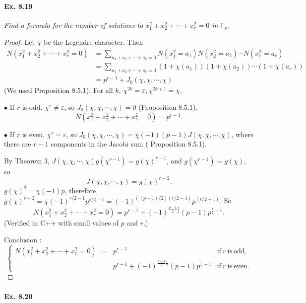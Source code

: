 \documentclass[11pt,a4paper]{article}
\newcommand{\F}{\mathbb{F}}
\begin{document}
{\paragraph{Ex. 8.19}

{\it Find a formula for the number of solutions to $x_1^2+x_2^2+\cdots+x_r^2 = 0$ in $\F_p$.
}

\begin{proof}
Let $\chi$ be the Legendre character. Then
\begin{align*}
N(x_1^2+x_2^2+\cdots+x_r^2=0) &= \sum\limits_{a_1+a_2+\cdots+a_r=0} N(x_1^2=a_1)N(x_2^2=a_2)\cdots N(x_r^2 = a_r)\\
&=\sum\limits_{a_1+a_2+\cdots+a_r=0} (1+\chi(a_1))(1+\chi(a_2))\cdots(1+\chi(a_r))\\
&=p^{r-1} + J_0(\chi,\chi,\cdots,\chi)
\end{align*}
(We used Proposition 8.5.1).
For all $k$, $\chi^{2k} = \varepsilon, \chi^{2k+1} = \chi$.

$\bullet$ If $r$ is odd, $\chi^r \neq \varepsilon$, so $J_0(\chi,\chi,\cdots,\chi) = 0$ (Proposition 8.5.1).
$$N(x_1^2+x_2^2+\cdots+x_r^2=0)  = p^{r-1}.$$

$\bullet$ If $r$ is even, $\chi^r = \varepsilon$, so $J_0(\chi,\chi,\cdots,\chi) = \chi(-1)(p-1)J(\chi,\chi,\cdots, \chi)$, where there are  $r-1$ components in the Jacobi sum ( Proposition 8.5.1).

By Theorem 3, $J(\chi,\chi,\cdots,\chi) g(\chi^{r-1}) = g(\chi)^{r-1}$, and  $g(\chi^{r-1}) = g(\chi)$, so
$$J(\chi,\chi,\cdots,\chi)=g(\chi)^{r-2}.$$
$g(\chi)^2 = \chi(-1) p$, therefore $g(\chi)^{r-2} = \chi(-1)^{r/2-1} p^{r/2-1} = (-1)^{((p-1)/2) (r/2-1)}p^{(r/2-1)}$. So
$$N(x_1^2+x_2^2+\cdots+x_r^2=0)  = p^{r-1}+(-1)^{\frac{p-1}{2} \frac{r}{2}} (p-1)p^{\frac{r}{2}-1}.$$
(Verified in C++ with small values of $p$ and $r$.)

Conclusion :
$$
\left\{
\begin{array}{ccll}
 N(x_1^2+x_2^2+\cdots+x_r^2=0)  & =  & p^{r-1}  &\mathrm{if}\ r\ \mathrm{is}\ \mathrm{odd},\\
  &  = &   p^{r-1}+(-1)^{\frac{p-1}{2} \frac{r}{2}} (p-1)p^{\frac{r}{2}-1} &\mathrm{if}\ r\  \mathrm{is}\ \mathrm{even}.
\end{array}
\right.
$$
\end{proof}

\paragraph{Ex. 8.20}

}
\end{document}
